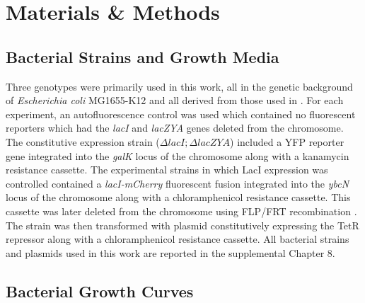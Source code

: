 \documentclass[12pt]{caltech_thesis}
\begin{document}
\hypertarget{materials-methods-2}{%
\section{Materials \& Methods}\label{materials-methods-2}}

\hypertarget{bacterial-strains-and-growth-media}{%
\subsection{Bacterial Strains and Growth
Media}\label{bacterial-strains-and-growth-media}}

Three genotypes were primarily used in this work, all in the genetic
background of \emph{Escherichia coli} MG1655-K12 and all derived from
those used in \textcite{brewster2014}. For each experiment, an
autofluorescence control was used which contained no fluorescent
reporters \autocite[except for a CFP volume marker used for segmentation
in][]{brewster2014} which had the \emph{lacI} and \emph{lacZYA} genes
deleted from the chromosome. The constitutive expression strain
(\(\Delta lacI; \Delta lacZYA\)) included a YFP reporter gene integrated
into the \emph{galK} locus of the chromosome along with a kanamycin
resistance cassette. The experimental strains in which LacI expression
was controlled contained a \emph{lacI-mCherry} fluorescent fusion
integrated into the \emph{ybcN} locus of the chromosome along with a
chloramphenicol resistance cassette. This cassette was later deleted
from the chromosome using FLP/FRT recombination
\autocite{schlake1994,zhu1995}. The strain was then transformed with
plasmid \autocite[pZS3-pN25-tetR following notation described
in][]{lutz1997} constitutively expressing the TetR repressor along with
a chloramphenicol resistance cassette. All bacterial strains and
plasmids used in this work are reported in the supplemental Chapter 8.

\hypertarget{bacterial-growth-curves}{%
\subsection{Bacterial Growth Curves}\label{bacterial-growth-curves}}
\end{document}
